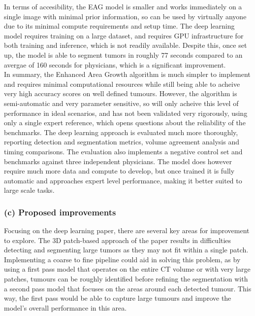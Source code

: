 \documentclass[11pt, a4paper]{article}
\begin{document}
\noindent In terms of accesibility, the EAG model is smaller and works immediately on a single image with minimal prior information, so can be used by virtually anyone due to its minimal compute requirements and setup time. 
The deep learning model requires training on a large dataset, and requires GPU infrastructure for both training and inference, which is not readily available. 
Despite this, once set up, the model is able to segment tumors in roughly 77 seconds compared to an avergae of 160 seconds for physicians, which is a significant improvement.\\

\noindent In summary, the Enhanced Area Growth algorithm is much simpler to implement and requires minimal computational resources while still being able to acheive very high accuracy scores on well defined tumours. 
However, the algorithm is semi-automatic and very parameter sensitive, so will only acheive this level of performance in ideal scenarios, and has not been validated very rigorously, using only a single expert reference, which opens questions about the reliability of the benchmarks. 
The deep learning approach is evaluated much more thoroughly, reporting detection and segmentation metrics, volume agreement analysis and timing comparisons. 
The evaluation also implements a negative control set and benchmarks against three independent physicians. 
The model does however require much more data and compute to develop, but once trained it is fully automatic and approaches expert level performance, making it better suited to large scale tasks. \\

\subsubsection*{(c) Proposed improvements}

\noindent Focusing on the deep learning paper, there are several key areas for improvement to explore. 
The 3D patch-based approach of the paper results in difficulties detecting and segmenting large tumors as they may not fit within a single patch. 
Implementing a coarse to fine pipeline could aid in solving this problem, as by using a first pass model that operates on the entire CT volume or with very large patches, tumours can be roughly identified before refining the segmentation with a second pass model that focuses on the areas around each detected tumour. 
This way, the first pass would be able to capture large tumours and improve the model's overall performance in this area.\\
\end{document}
